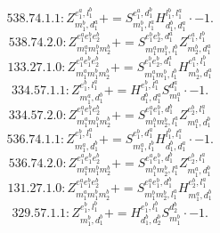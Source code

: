 \documentclass[letterpaper,10pt,fleqn,leqno,onecolumn]{article}
\begin{document}
\begin{equation} \;\;\;\;\;\;  538.74.1.1: Z^{e_{1}^{a},l_{1}^{b}}_{m_{1}^{b},d_{1}^{a}}+=S^{e_{1}^{a},d_{1}^{b}}_{m_{1}^{b},l_{1}^{a}}H^{l_{1}^{b},l_{1}^{a}}_{d_{1}^{b},d_{1}^{a}}\cdot -1. \end{equation}
\begin{equation} \;\;\;\;\;\;  538.74.2.0: Z^{e_{1}^{a}e_{1}^{b}e_{2}^{b}}_{m_{1}^{a}m_{1}^{b}m_{2}^{b}}+=S^{e_{1}^{b}e_{2}^{b},d_{1}^{a}}_{m_{1}^{a}m_{1}^{b},l_{1}^{b}}Z^{e_{1}^{a},l_{1}^{b}}_{m_{2}^{b},d_{1}^{a}} \end{equation}
\begin{equation} \;\;\;\;\;\;  133.27.1.0: Z^{e_{1}^{a}e_{1}^{b}e_{2}^{b}}_{m_{1}^{a}m_{1}^{b}m_{2}^{b}}+=S^{e_{1}^{b}e_{2}^{b},d_{1}^{a}}_{m_{1}^{a}m_{1}^{b},l_{1}^{b}}H^{e_{1}^{a},l_{1}^{b}}_{m_{2}^{b},d_{1}^{a}} \end{equation}
\begin{equation} \;\;\;\;\;\;  334.57.1.1: Z^{e_{1}^{b},l_{1}^{a}}_{m_{1}^{a},d_{1}^{b}}+=H^{e_{1}^{b},l_{1}^{a}}_{d_{1}^{b},d_{1}^{a}}S^{d_{1}^{a}}_{m_{1}^{a}}\cdot -1. \end{equation}
\begin{equation} \;\;\;\;\;\;  334.57.2.0: Z^{e_{1}^{a}e_{1}^{b}e_{2}^{b}}_{m_{1}^{a}m_{1}^{b}m_{2}^{b}}+=S^{e_{1}^{a}e_{1}^{b},d_{1}^{b}}_{m_{1}^{b}m_{2}^{b},l_{1}^{a}}Z^{e_{2}^{b},l_{1}^{a}}_{m_{1}^{a},d_{1}^{b}} \end{equation}
\begin{equation} \;\;\;\;\;\;  536.74.1.1: Z^{e_{1}^{b},l_{1}^{a}}_{m_{1}^{a},d_{1}^{b}}+=S^{e_{1}^{b},d_{1}^{a}}_{m_{1}^{a},l_{1}^{b}}H^{l_{1}^{b},l_{1}^{a}}_{d_{1}^{b},d_{1}^{a}}\cdot -1. \end{equation}
\begin{equation} \;\;\;\;\;\;  536.74.2.0: Z^{e_{1}^{a}e_{1}^{b}e_{2}^{b}}_{m_{1}^{a}m_{1}^{b}m_{2}^{b}}+=S^{e_{1}^{a}e_{1}^{b},d_{1}^{b}}_{m_{1}^{b}m_{2}^{b},l_{1}^{a}}Z^{e_{2}^{b},l_{1}^{a}}_{m_{1}^{a},d_{1}^{b}} \end{equation}
\begin{equation} \;\;\;\;\;\;  131.27.1.0: Z^{e_{1}^{a}e_{1}^{b}e_{2}^{b}}_{m_{1}^{a}m_{1}^{b}m_{2}^{b}}+=S^{e_{1}^{a}e_{1}^{b},d_{1}^{b}}_{m_{1}^{b}m_{2}^{b},l_{1}^{a}}H^{e_{2}^{b},l_{1}^{a}}_{m_{1}^{a},d_{1}^{b}} \end{equation}
\begin{equation} \;\;\;\;\;\;  329.57.1.1: Z^{e_{1}^{b},l_{1}^{b}}_{m_{1}^{b},d_{1}^{b}}+=H^{e_{1}^{b},l_{1}^{b}}_{d_{1}^{b},d_{2}^{b}}S^{d_{2}^{b}}_{m_{1}^{b}}\cdot -1. \end{equation}
\end{document}
